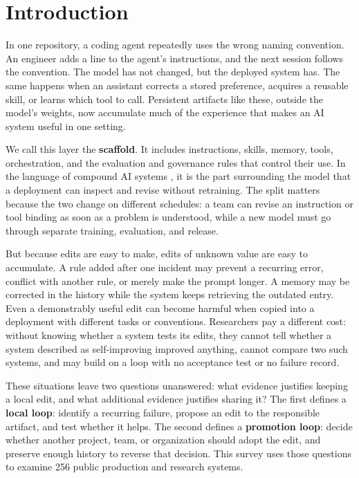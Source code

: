 \section{Introduction}\label{sec:intro}

In one repository, a coding agent repeatedly uses the wrong naming convention. An engineer adds a line to the agent's instructions, and the next session follows the convention. The model has not changed, but the deployed system has. The same happens when an assistant corrects a stored preference, acquires a reusable skill, or learns which tool to call. Persistent artifacts like these, outside the model's weights, now accumulate much of the experience that makes an AI system useful in one setting.

We call this layer the \textbf{scaffold}. It includes instructions, skills, memory, tools, orchestration, and the evaluation and governance rules that control their use. In the language of compound AI systems \cite{zaharia2024compound}, it is the part surrounding the model that a deployment can inspect and revise without retraining. The split matters because the two change on different schedules: a team can revise an instruction or tool binding as soon as a problem is understood, while a new model must go through separate training, evaluation, and release.

But because edits are easy to make, edits of unknown value are easy to accumulate. A rule added after one incident may prevent a recurring error, conflict with another rule, or merely make the prompt longer. A memory may be corrected in the history while the system keeps retrieving the outdated entry. Even a demonstrably useful edit can become harmful when copied into a deployment with different tasks or conventions. Researchers pay a different cost: without knowing whether a system tests its edits, they cannot tell whether a system described as self-improving improved anything, cannot compare two such systems, and may build on a loop with no acceptance test or no failure record.

These situations leave two questions unanswered: what evidence justifies keeping a local edit, and what additional evidence justifies sharing it? The first defines a \textbf{local loop}: identify a recurring failure, propose an edit to the responsible artifact, and test whether it helps. The second defines a \textbf{promotion loop}: decide whether another project, team, or organization should adopt the edit, and preserve enough history to reverse that decision. This survey uses those questions to examine 256 public production and research systems.

